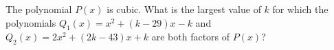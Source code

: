 The polynomial $P(x)$ is cubic.  What is the largest value of $k$ for which the polynomials $Q_{1}(x) = x^{2}+(k-29)x-k$ and $Q_{2}(x) = 2x^{2}+(2k-43)x+k$ are both factors of $P(x)$?